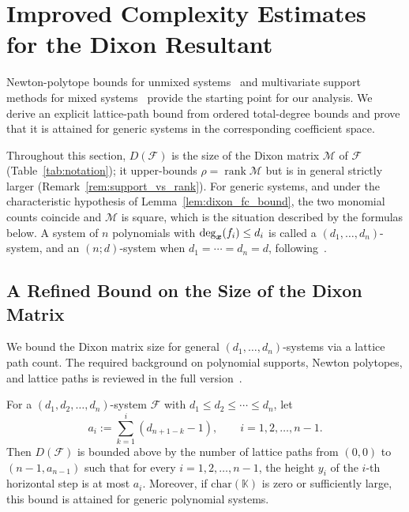 \section{Improved Complexity Estimates for the Dixon Resultant}\label{Section:Complexity}

Newton-polytope bounds for unmixed systems~\cite{DBLP:conf/stoc/KapurS96} and multivariate support methods for mixed systems~\cite{ChtcherbaKapur2004} provide the starting point for our analysis. We derive an explicit lattice-path bound from ordered total-degree bounds and prove that it is attained for generic systems in the corresponding coefficient space.

Throughout this section, $D(\mathcal{F})$ is the size of the Dixon matrix $\mathcal{M}$ of $\mathcal{F}$ (Table~\ref{tab:notation}); it upper-bounds $\rho=\operatorname{rank}\mathcal{M}$ but is in general strictly larger (Remark~\ref{rem:support_vs_rank}). For generic systems, and under the characteristic hypothesis of Lemma~\ref{lem:dixon_fc_bound}, the two monomial counts coincide and $\mathcal{M}$ is square, which is the situation described by the formulas below. A system of $n$ polynomials with $\deg_{{\boldsymbol{x}}}(f_i)\le d_i$ is called a $(d_1,\ldots,d_n)$-system, and an $(n;d)$-system when $d_1=\cdots=d_n=d$, following~\cite{DBLP:conf/stoc/KapurS96}.

\subsection{A Refined Bound on the Size of the Dixon Matrix}\label{Subsection:Matrix_Size}

We bound the Dixon matrix size for general $(d_1,\ldots,d_n)$-systems via a lattice path count. The required background on polynomial supports, Newton polytopes, and lattice paths is reviewed in the full version~\cite{cryptoeprint:2026/1969}.

\begin{theorem}\label{thm:dixon_general_bound}
	For a $(d_1, d_2, \ldots, d_n)$-system $\mathcal{F}$ with 
	$d_1 \leq d_2 \leq \cdots \leq d_n$, 
	let
	\[
	a_i := \sum_{k=1}^{i} (d_{n+1-k}-1),
	\qquad i=1,2,\ldots,n-1.
	\]
	Then $D(\mathcal{F})$ is bounded above by the number of lattice paths 
	from $(0,0)$ to $(n-1, a_{n-1})$ such that for every 
	$i=1,2,\ldots,n-1$, the height $y_i$ of the $i$-th horizontal step is at most $a_i$.
	Moreover, if $\mathrm{char}(\mathbb{K})$ is zero or sufficiently large, this bound is attained for generic polynomial systems.
\end{theorem}

